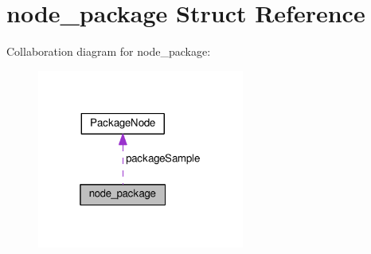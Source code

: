 \hypertarget{structnode__package}{}\section{node\+\_\+package Struct Reference}
\label{structnode__package}


Collaboration diagram for node\+\_\+package\+:
\nopagebreak
\begin{figure}[H]
\begin{center}
\leavevmode
\includegraphics[width=193pt]{structnode__package__coll__graph}
\end{center}
\end{figure}
